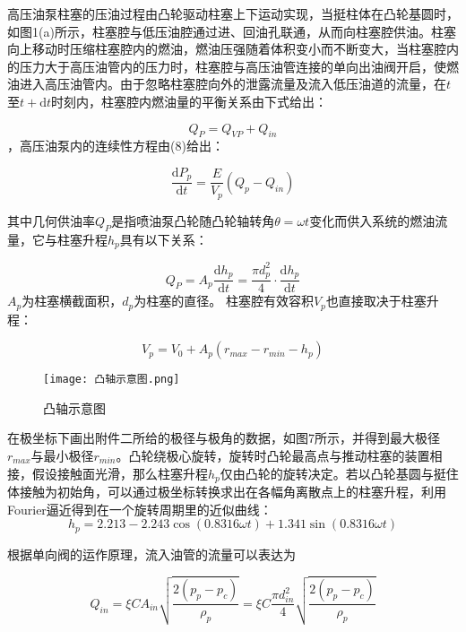 \documentclass[withoutpreface,bwprint]{cumcmthesis} %
\begin{document}
			高压油泵柱塞的压油过程由凸轮驱动柱塞上下运动实现，当挺柱体在凸轮基圆时，如图1(a)所示，柱塞腔与低压油腔通过进、回油孔联通，从而向柱塞腔供油。柱塞向上移动时压缩柱塞腔内的燃油，燃油压强随着体积变小而不断变大，当柱塞腔内的压力大于高压油管内的压力时，柱塞腔与高压油管连接的单向出油阀开启，使燃油进入高压油管内。由于忽略柱塞腔向外的泄露流量及流入低压油道的流量，在$t$至$t + \mathrm{d}t$时刻内，柱塞腔内燃油量的平衡关系由下式给出：
			
			\begin{equation}Q_P = Q_{VP} + Q_{in}\end{equation}，高压油泵内的连续性方程由(8)给出：
			
			\begin{equation}\frac{\mathrm{d}P_p}{\mathrm{d}t} = \frac{E}{V_p}(Q_{p} - Q_{in})\end{equation}
			
			其中几何供油率$Q_P$是指喷油泵凸轮随凸轮轴转角$\theta = \omega t$变化而供入系统的燃油流量，它与柱塞升程$h_p$具有以下关系：
			
			\begin{equation}Q_P = A_p \frac{\mathrm{d}h_p}{\mathrm{d}t} = \frac{\pi d_p^2}{4} \cdot \frac{\mathrm{d}h_p}{\mathrm{d}t}\end{equation}
			$A_p$为柱塞横截面积，$d_p$为柱塞的直径。
			柱塞腔有效容积$V_p$也直接取决于柱塞升程：
			
			\begin{equation}V_p = V_0 + A_p (r_{max} - r_{min} - h_p)\end{equation}
			
			\begin{figure}[!htbp]
				\centering
				\texttt{[image: 凸轴示意图.png]}
				\caption{凸轴示意图}
			\end{figure}
		
			在极坐标下画出附件二所给的极径与极角的数据，如图7所示，并得到最大极径$r_{max}$与最小极径$r_{min}$。凸轮绕极心旋转，旋转时凸轮最高点与推动柱塞的装置相接，假设接触面光滑，那么柱塞升程$h_p$仅由凸轮的旋转决定。若以凸轮基圆与挺住体接触为初始角，可以通过极坐标转换求出在各幅角离散点上的柱塞升程，利用Fourier逼近得到在一个旋转周期里的近似曲线：
			\begin{equation}h_p = 2.213 - 2.243 \cos(0.8316 \omega t) + 1.341 \sin(0.8316 \omega t)\end{equation}
			
			根据单向阀的运作原理，流入油管的流量可以表达为
			
			\begin{equation}Q_{in} = \xi CA_{in} \sqrt{\frac{2(p_p - p_c)}{\rho_p}} = \xi C \frac{\pi d_{in}^2}{4} \sqrt{\frac{2(p_p - p_c)}{\rho_p}}\end{equation}
			
\end{document}
